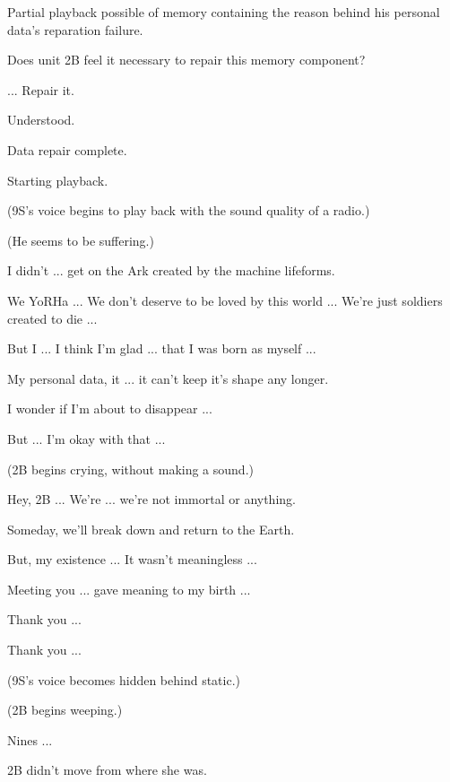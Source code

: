 \begin{play}
	  Partial playback possible of memory containing the reason behind his personal data's reparation failure.
	
	  Does unit 2B feel it necessary to repair this memory component?
	
	  ... Repair it.
	
	  Understood.
	
	  Data repair complete.
	
	  Starting playback.
	
	(9S's voice begins to play back with the sound quality of a radio.)
	
	(He seems to be suffering.)
	
	  I didn't ... get on the Ark created by the machine lifeforms.
	
	  We YoRHa ... We don't deserve to be loved by this world ... We're just soldiers created to die ...
	
	  But I ... I think I'm glad ... that I was born as myself ...
	
	  My personal data, it ... it can't keep it's shape any longer.
	
	  I wonder if I'm about to disappear ...
	
	  But ... I'm okay with that ...
	
	(2B begins crying, without making a sound.)
	
	  Hey, 2B ... We're ... we're not immortal or anything.
	
	  Someday, we'll break down and return to the Earth.
	
	  But, my existence ... It wasn't meaningless ...
	
	  Meeting you ... gave meaning to my birth ...
	
	  Thank you ...
	
	  Thank you ...
	
	(9S's voice becomes hidden behind static.)
	
	(2B begins weeping.)
	
	  Nines ...
	
	  2B didn't move from where she was.
	

\end{play}
